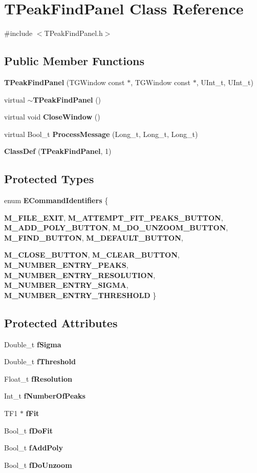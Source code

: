 \section{TPeakFindPanel Class Reference}
\label{classTPeakFindPanel}


{\ttfamily \#include $<$TPeakFindPanel.h$>$}

\subsection*{Public Member Functions}
\begin{DoxyCompactItemize}
\item 
{\bf TPeakFindPanel} (TGWindow const $\ast$, TGWindow const $\ast$, UInt\_\-t, UInt\_\-t)
\item 
virtual {\bf $\sim$TPeakFindPanel} ()
\item 
virtual void {\bf CloseWindow} ()
\item 
virtual Bool\_\-t {\bf ProcessMessage} (Long\_\-t, Long\_\-t, Long\_\-t)
\item 
{\bf ClassDef} ({\bf TPeakFindPanel}, 1)
\end{DoxyCompactItemize}
\subsection*{Protected Types}
\begin{DoxyCompactItemize}
\item 
enum {\bf ECommandIdentifiers} \{ \par
{\bf M\_\-FILE\_\-EXIT}, 
{\bf M\_\-ATTEMPT\_\-FIT\_\-PEAKS\_\-BUTTON}, 
{\bf M\_\-ADD\_\-POLY\_\-BUTTON}, 
{\bf M\_\-DO\_\-UNZOOM\_\-BUTTON}, 
{\bf M\_\-FIND\_\-BUTTON}, 
{\bf M\_\-DEFAULT\_\-BUTTON}, 
\par
{\bf M\_\-CLOSE\_\-BUTTON}, 
{\bf M\_\-CLEAR\_\-BUTTON}, 
{\bf M\_\-NUMBER\_\-ENTRY\_\-PEAKS}, 
{\bf M\_\-NUMBER\_\-ENTRY\_\-RESOLUTION}, 
{\bf M\_\-NUMBER\_\-ENTRY\_\-SIGMA}, 
{\bf M\_\-NUMBER\_\-ENTRY\_\-THRESHOLD}
 \}
\end{DoxyCompactItemize}
\subsection*{Protected Attributes}
\begin{DoxyCompactItemize}
\item 
Double\_\-t {\bf fSigma}
\item 
Double\_\-t {\bf fThreshold}
\item 
Float\_\-t {\bf fResolution}
\item 
Int\_\-t {\bf fNumberOfPeaks}
\item 
TF1 $\ast$ {\bf fFit}
\item 
Bool\_\-t {\bf fDoFit}
\item 
Bool\_\-t {\bf fAddPoly}
\item 
Bool\_\-t {\bf fDoUnzoom}
\end{DoxyCompactItemize}
